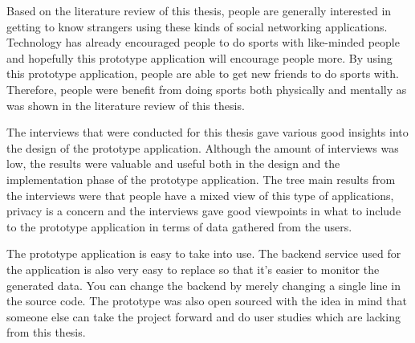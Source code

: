 Based on the literature review of this thesis, people are generally interested in getting to know strangers using these kinds of social networking applications. Technology has already encouraged people to do sports with like-minded people and hopefully this prototype application will encourage people more. By using this prototype application, people are able to get new friends to do sports with. Therefore, people were benefit from doing sports both physically and mentally as was shown in the literature review of this thesis.

The interviews that were conducted for this thesis gave various good insights into the design of the prototype application. Although the amount of interviews was low, the results were valuable and useful both in the design and the implementation phase of the prototype application. The tree main results from the interviews were that people have a mixed view of this type of applications, privacy is a concern and the interviews gave good viewpoints in what to include to the prototype application in terms of data gathered from the users.

The prototype application is easy to take into use. The backend service used for the application is also very easy to replace so that it's easier to monitor the generated data. You can change the backend by merely changing a single line in the source code. The prototype was also open sourced with the idea in mind that someone else can take the project forward and do user studies which are lacking from this thesis.

